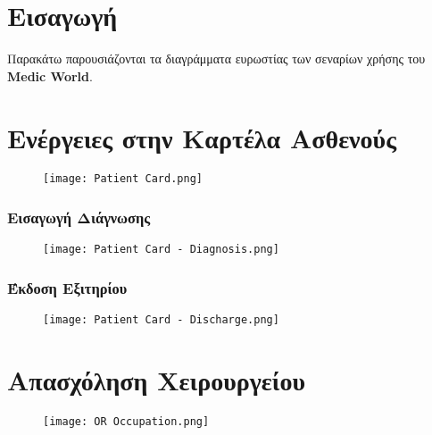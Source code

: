 \documentclass{article}
\begin{document}
\section{Εισαγωγή}

Παρακάτω παρουσιάζονται τα διαγράμματα ευρωστίας των σεναρίων χρήσης του \textbf{Medic World}.


\section{Ενέργειες στην Καρτέλα Ασθενούς}

\vspace{0.2cm}

\begin{figure}[!htb]
        \centering
        \texttt{[image: Patient Card.png]}
\end{figure}

\newpage

\subsubsection{Εισαγωγή Διάγνωσης}

\vspace{0.2cm}

\begin{figure}[!htb]
        \centering
        \texttt{[image: Patient Card - Diagnosis.png]}
\end{figure}

\newpage

\subsubsection{Έκδοση Εξιτηρίου}

\vspace{0.2cm}

\begin{figure}[!htb]
        \centering
        \texttt{[image: Patient Card - Discharge.png]}
\end{figure}

\newpage

\section{Απασχόληση Χειρουργείου}

\vspace{0.2cm}

\begin{figure}[!htb]
        \centering
        \texttt{[image: OR Occupation.png]}
\end{figure}
\end{document}
